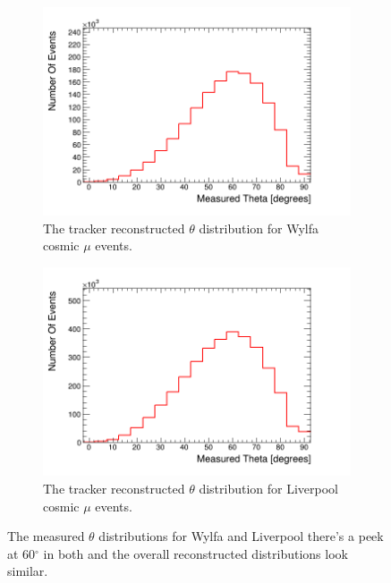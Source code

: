 \begin{figure}[htbp]
\centering
\begin{subfigure}{.5\textwidth}
  \centering
  \includegraphics[width=\linewidth]{Chapter5/Figs/UsingSimulatedDataAsControl/measuredThetaWylfa.png}
  \captionsetup{width=.9\linewidth}
  \caption{The tracker reconstructed $\theta$ distribution for Wylfa cosmic $\mu$ events.}
  \label{subFig:measuredThetaWylfa}
\end{subfigure}%
\begin{subfigure}{.5\textwidth}
  \centering
\includegraphics[width=\linewidth]{Chapter5/Figs/UsingSimulatedDataAsControl/measuredThetaLiverpool.png}
  \captionsetup{width=.9\linewidth}
  \caption{The tracker reconstructed $\theta$ distribution for Liverpool cosmic $\mu$ events.}
  \label{subFig:measuredThetaLiverpool}
\end{subfigure}
\caption{The measured $\theta$ distributions for Wylfa and Liverpool there's a peek at 60$^\circ$ in both and the overall reconstructed distributions look similar.}
\label{fig:measuredThetaWylfaLiverpool}
\end{figure}

